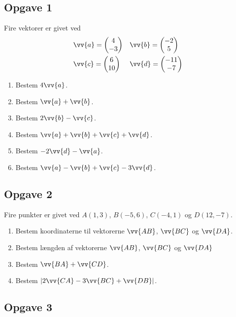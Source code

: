 \subsection*{Opgave 1}
Fire vektorer er givet ved
\begin{align*}
	&\vv{a} = 
	\begin{pmatrix}
		4 \\ -3
	\end{pmatrix} 
	&
	&\vv{b} = 
	\begin{pmatrix}
		-2 \\ 5
	\end{pmatrix}
	\\
	&\vv{c} = 
	\begin{pmatrix}
		6 \\ 10
	\end{pmatrix}
	&
	&\vv{d} = 
	\begin{pmatrix}
		-11 \\ -7
	\end{pmatrix}
\end{align*}

\begin{enumerate}[label=\roman*)]
	\item Bestem $4\vv{a}$.
	\item Bestem $\vv{a} + \vv{b}$.
	\item Bestem $2\vv{b} - \vv{c}$.
	\item Bestem $\vv{a}+\vv{b}+\vv{c}+\vv{d}$.
	\item Bestem $-2\vv{d} - \vv{a}$.
	\item Bestem $\vv{a}-\vv{b}+\vv{c}-3\vv{d}$.
\end{enumerate}

\subsection*{Opgave 2}

Fire punkter er givet ved $A(1,3)$, $B(-5,6)$, $C(-4,1)$ og $D(12,-7)$.
\begin{enumerate}[label = \roman*)]
	\item Bestem koordinaterne til vektorerne $\vv{AB}$, $\vv{BC}$ og $\vv{DA}$.
	\item Bestem længden af vektorerne $\vv{AB}$, $\vv{BC}$ og $\vv{DA}$
	\item Bestem $\vv{BA} + \vv{CD}$.
	\item Bestem $|2\vv{CA} - 3\vv{BC} + \vv{DB}|$.
\end{enumerate}

\subsection*{Opgave 3}

